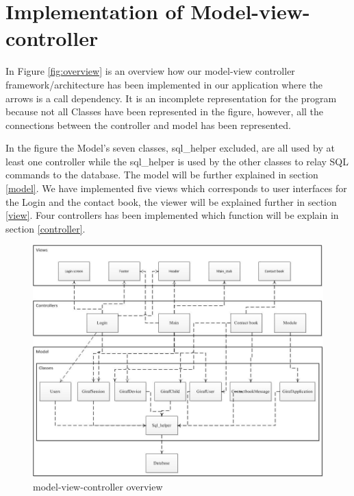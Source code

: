 \section{Implementation of Model-view-controller}
In Figure \vref{fig:overview} is an overview how our model-view controller framework/architecture has been implemented in our application where the arrows is a call dependency. It is an incomplete representation for the program because not all Classes have been represented in the figure, however, all the connections between the controller and model has been represented. 

In the figure the Model's seven classes, sql\_helper excluded, are all used by at least one controller while the sql\_helper is used by the other classes to relay SQL commands to the database. The model will be further explained in section \vref{model}. We have implemented five views which corresponds to user interfaces for the Login and the contact book, the viewer will be explained further in section \vref{view}. Four controllers has been implemented which function will be explain in section \vref{controller}.

\begin{figure}
	\centering
		\includegraphics[width=1.00\textwidth]{img/overview.jpg}
	\caption{model-view-controller overview}
	\label{fig:overview}
\end{figure}

